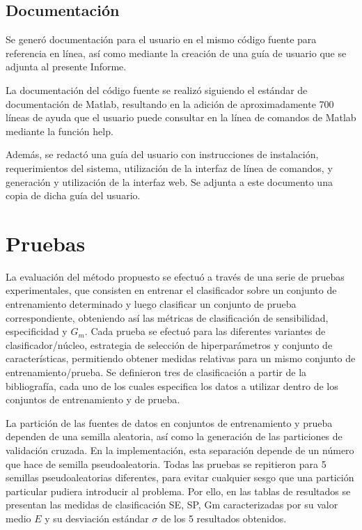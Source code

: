 \section{Documentación}
Se generó documentación para el usuario en el mismo código fuente para
referencia en línea, así como mediante la creación de una guía de
usuario que se adjunta al presente Informe.

La documentación del código fuente se realizó siguiendo el estándar de
documentación de Matlab, resultando en la adición de aproximadamente
700 líneas de ayuda que el usuario puede consultar en la línea de
comandos de Matlab mediante la función {\mono help}.

Además, se redactó una guía del usuario con instrucciones de
instalación, requerimientos del sistema, utilización de la interfaz de
línea de comandos, y generación y utilización de la interfaz web.  Se
adjunta a este documento una copia de dicha guía del usuario.

\chapter{Pruebas}
La evaluación del método propuesto se efectuó a través de una serie de
pruebas experimentales, que consisten en entrenar el clasificador
sobre un conjunto de entrenamiento determinado y luego clasificar un
conjunto de prueba correspondiente, obteniendo así las métricas de
clasificación de sensibilidad, especificidad y $G_m$.  Cada prueba se
efectuó para las diferentes variantes de clasificador/núcleo,
estrategia de selección de hiperparámetros y conjunto de
características, permitiendo obtener medidas relativas para un mismo
conjunto de entrenamiento/prueba.  Se definieron tres  de
clasificación a partir de la bibliografía, cada uno de los cuales
especifica los datos a utilizar dentro de los conjuntos de
entrenamiento y de prueba.

La partición de las fuentes de datos en conjuntos de entrenamiento
y prueba dependen de una semilla aleatoria, así como la generación
de las particiones de validación cruzada. En la implementación, esta
separación depende de un número que hace de semilla pseudoaleatoria.
Todas las pruebas se repitieron para 5 semillas pseudoaleatorias
diferentes, para evitar cualquier sesgo
que una partición particular pudiera introducir al problema.
Por ello, en las tablas de resultados se presentan las medidas de
clasificación SE, SP, Gm caracterizadas por su valor medio $E$ y su
desviación estándar $\sigma$ de los 5 resultados
obtenidos.

